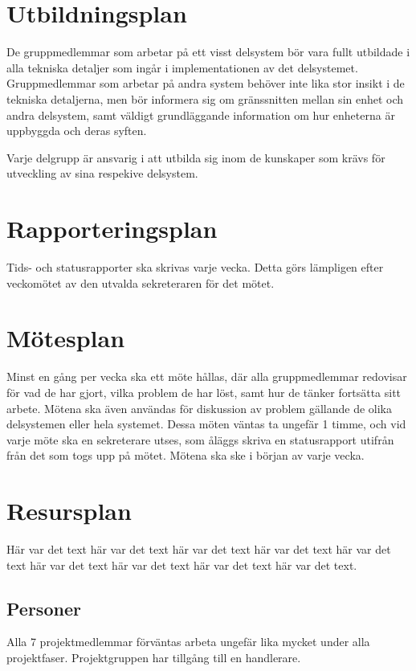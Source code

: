 \documentclass[a4paper,titlepage,12pt]{article}
\begin{document}
	
	\section{Utbildningsplan}

    De gruppmedlemmar som arbetar på ett visst delsystem bör vara fullt
    utbildade i alla tekniska detaljer som ingår i implementationen av det
    delsystemet. Gruppmedlemmar som arbetar på andra system behöver inte lika
    stor insikt i de tekniska detaljerna, men bör
    informera sig om gränssnitten mellan sin enhet och andra delsystem, samt väldigt 
    grundläggande information om hur enheterna är uppbyggda och deras syften.

    Varje delgrupp är ansvarig i att utbilda sig inom de kunskaper som krävs
    för utveckling av sina respekive delsystem.

	\section{Rapporteringsplan}
	Tids- och statusrapporter ska skrivas varje vecka. Detta görs lämpligen
    efter veckomötet av den utvalda sekreteraren för det mötet.
	
	\section{Mötesplan}
    Minst en gång per vecka ska ett möte hållas, där alla gruppmedlemmar
    redovisar för vad de har gjort, vilka problem de har löst, samt hur de
    tänker fortsätta sitt arbete. Mötena ska även användas för diskussion av
    problem gällande de olika delsystemen eller hela systemet. Dessa möten väntas 
    ta ungefär 1 timme, och vid varje möte ska en sekreterare utses, som åläggs skriva 
    en statusrapport utifrån från det som togs upp på mötet. Mötena ska ske i början av
    varje vecka.
	
	
	\section{Resursplan}
	Här var det text här var det text här var det text
	här var det text här var det text här var det text
	här var det text här var det text här var det text.
	
	
	\subsection{Personer}
    Alla 7 projektmedlemmar förväntas arbeta ungefär lika mycket under alla
    projektfaser. Projektgruppen har tillgång till en handlerare.
	
\end{document}
